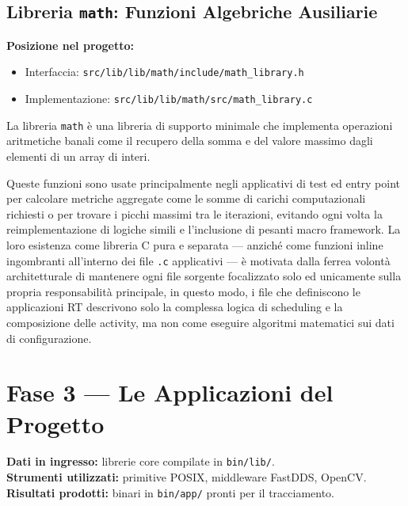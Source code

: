 \clearpage

\subsection{Libreria \texttt{math}: Funzioni Algebriche Ausiliarie}
\label{sec:lib_math}

\noindent\textbf{Posizione nel progetto:}
\begin{itemize}
	\item Interfaccia: \texttt{src/lib/lib/math/include/math\_library.h}
	\item Implementazione: \texttt{src/lib/lib/math/src/math\_library.c}
\end{itemize}

La libreria \texttt{math} è una libreria di supporto minimale che implementa operazioni aritmetiche banali come il recupero della somma e del valore massimo dagli elementi di un array di interi.

Queste funzioni sono usate principalmente negli applicativi di test ed entry point per calcolare metriche aggregate come le somme di carichi computazionali richiesti o per trovare i picchi massimi tra le iterazioni, evitando ogni volta la reimplementazione di logiche simili e l'inclusione di pesanti macro framework. 
La loro esistenza come libreria C pura e separata — anziché come funzioni inline ingombranti all'interno dei file \texttt{.c} applicativi — è motivata dalla ferrea volontà architetturale di mantenere ogni file sorgente focalizzato solo ed unicamente sulla propria responsabilità principale, in questo modo, i file che definiscono le applicazioni RT descrivono solo la complessa logica di scheduling e la composizione delle activity, ma non come eseguire algoritmi matematici sui dati di configurazione.



\section{Fase 3 --- Le Applicazioni del Progetto}
\label{sec:fase3_applicazioni}

\noindent\textbf{Dati in ingresso:} librerie core compilate in \texttt{bin/lib/}.\\
\textbf{Strumenti utilizzati:} primitive POSIX, middleware FastDDS, OpenCV.\\
\textbf{Risultati prodotti:} binari in \texttt{bin/app/} pronti per il tracciamento.


